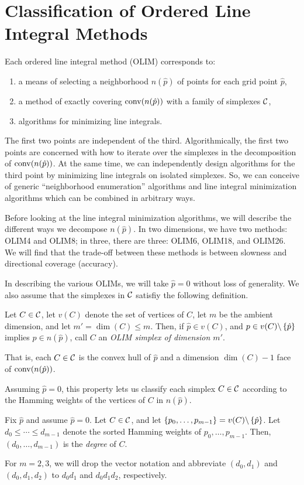\documentclass[eikonal.tex]{subfiles}
\begin{document}
\section{Classification of Ordered Line Integral Methods}

Each ordered line integral method (OLIM) corresponds to:
\begin{enumerate}
\item a means of selecting a neighborhood $n(\hat{p})$ of points for
  each grid point $\hat{p}$,
\item a method of exactly covering $\operatorname{conv}(n(\hat{p}))$ with a family
  of simplexes $\mathcal{C}$,
\item algorithms for minimizing line integrals.
\end{enumerate}
The first two points are independent of the third. Algorithmically,
the first two points are concerned with how to iterate over the
simplexes in the decomposition of $\operatorname{conv}(n(\hat{p}))$. At the same
time, we can independently design algorithms for the third point by
minimizing line integrals on isolated simplexes. So, we can conceive
of generic ``neighborhood enumeration'' algorithms and line integral
minimization algorithms which can be combined in arbitrary ways.

Before looking at the line integral minimization algorithms, we will
describe the different ways we decompose $n(\hat{p})$. In two
dimensions, we have two methods: OLIM4 and OLIM8; in three, there are
three: OLIM6, OLIM18, and OLIM26. We will find that the trade-off
between these methods is between slowness and directional coverage
(accuracy).

In describing the various OLIMs, we will take $\hat{p} = 0$ without
loss of generality. We also assume that the simplexes in $\mathcal{C}$
satisfiy the following definition.
\begin{defn}\label{def:olim-simplex}
  Let $C \in \mathcal{C}$, let $v(C)$ denote the set of vertices of $C$, let
  $m$ be the ambient dimension, and let $m' = \dim(C) \leq m$. Then,
  if $\hat{p} \in v(C)$, and $p \in v(C) \backslash \left\{\hat{p}\right\}$
  implies $p \in n(\hat{p})$, call $C$ an \emph{OLIM simplex of
    dimension $m'$}.
\end{defn}
\noindent That is, each $C \in \mathcal{C}$ is the convex hull of $\hat{p}$
and a dimension $\dim(C) - 1$ face of $\operatorname{conv}(n(\hat{p}))$.

Assuming $\hat{p} = 0$, this property lets us classify each simplex
$C \in \mathcal{C}$ according to the Hamming weights of the vertices of $C$
in $n(\hat{p})$.
\begin{defn}
  Fix $\hat{p}$ and assume $\hat{p} = 0$. Let $C \in \mathcal{C}$, and let
  $\left\{p_0, \hdots, p_{m-1}\right\} = v(C) \backslash \left\{\hat{p}\right\}$. Let
  $d_0 \leq \cdots \leq d_{m-1}$ denote the sorted Hamming weights of
  $p_0, \hdots, p_{m-1}$. Then, $(d_0, \hdots, d_{m-1})$ is the
  \emph{degree} of $C$.
\end{defn}
\noindent For $m = 2, 3$, we will drop the vector notation and abbreviate
$(d_0, d_1)$ and $(d_0, d_1, d_2)$ to $d_0d_1$ and $d_0d_1d_2$,
respectively.
\end{document}
